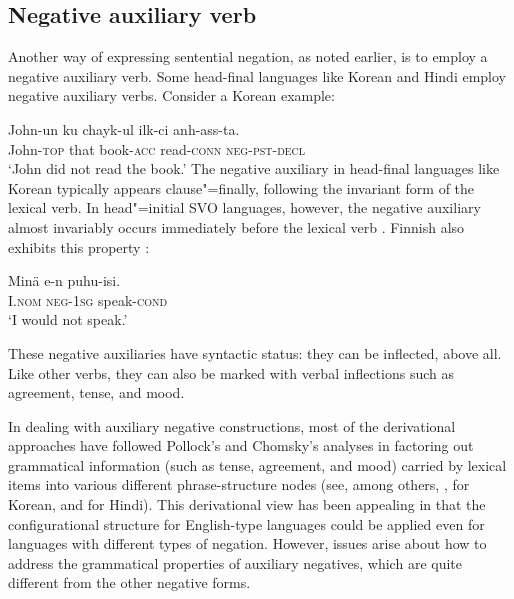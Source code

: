\documentclass[output=paper
                ,modfonts
                ,nonflat
	        ,collection
	        ,collectionchapter
	        ,collectiontoclongg
 	        ,biblatex
                ,babelshorthands
                ,newtxmath
                ,draftmode
                ,colorlinks, citecolor=brown
]{./langsci/langscibook}
\begin{document}
{\begin{exe}
\begin{xlist}
\begin{exe}
\begin{xlist}
\section{Negative auxiliary verb}

Another way of expressing sentential negation, as noted earlier, is to employ
a negative auxiliary
verb. Some head-final languages like Korean and Hindi employ
negative auxiliary verbs. Consider a Korean example:

\ea
\gll John-un ku chayk-ul ilk-ci anh-ass-ta. \\
     John-\textsc{top} that book-\textsc{acc} read-\textsc{conn} \textsc{neg}-\textsc{pst}-\textsc{decl}  \\
\glt `John did not read the book.'
\z
%
%
\noindent
The negative auxiliary in head-final languages like Korean
typically appears clause"=finally, following the invariant form of the lexical verb.
In head"=initial SVO languages, however, the negative auxiliary
almost invariably occurs immediately before the lexical verb
\citep{Payne:85}. Finnish also exhibits this property \citep{Mitchell:91}:

\ea
\gll Min\"{a} e-n puhu-isi. \\
     I.\textsc{nom} \textsc{neg}-\textsc{1sg} speak-\textsc{cond} \\
\glt `I would not speak.'
\z

\noindent
These negative auxiliaries have syntactic status: they can be
inflected, above all. Like other verbs, they can also be marked
with verbal inflections such as agreement, tense, and mood.

In dealing with auxiliary negative constructions,
most of the derivational approaches have
followed Pollock's and Chomsky's analyses in factoring out grammatical
information (such as tense, agreement, and mood) carried by lexical items into various different phrase-structure nodes (see, among others, \citealt{Hagstrom:02}, \citealt{Han:07} for Korean, and \citealt{Vasishth:00} for Hindi).
This derivational view has
been appealing in that the configurational structure for English-type
languages could be applied even for languages with different types
of negation. However, issues arise about how to address the grammatical
properties of auxiliary negatives, which are quite different from the
other negative forms.
%
%
%
%


\end{xlist}
\end{exe}
\end{xlist}
\end{exe}}
\end{document}
